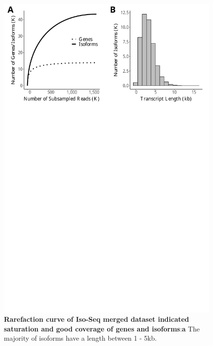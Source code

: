 \begin{figure}[!h]
	\begin{center}
		\includegraphics[page=1,trim={0 26cm 0 0},clip,scale = 0.55]{Figures/IsoSeqWholeTranscriptome.pdf}
	\end{center}
	\captionsetup{width=0.95\textwidth}
	\caption[Rarefaction Curves of Whole Transcriptome Iso-Seq Runs]%
	{\textbf{Rarefaction curve of Iso-Seq merged dataset indicated saturation and good coverage of genes and isoforms}:\textbf{a} The majority of isoforms have a length between 1 - 5kb.}
	\label{fig:isoseq_whole_rarefaction}
\end{figure}

